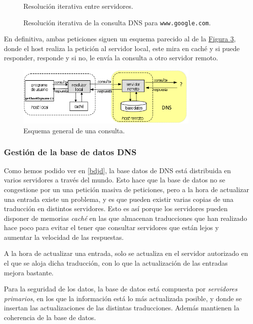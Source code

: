 \documentclass[10pt,a4paper,spanish]{report}
\begin{document}
\begin{enumerate}[\color{tema2}{$\square$}]
\begin{figure}[H]
    \caption{Resolución iterativa entre servidores.}
    \label{tema2_3}
  \end{figure}
  \begin{figure}[H]
    \centering
    
    \caption{Resolución iterativa de la consulta DNS para \texttt{www.google.com}.}
    \label{tema2_4}
    \end{figure}
 \end{enumerate} 

 En definitiva, ambas peticiones siguen un esquema parecido al de la \hyperref[tema2_5]{Figura \ref*{tema2_5}}, donde el host realiza la petición al servidor local, este mira en caché y si puede responder, responde y si no, le envía la consulta a otro servidor remoto.

\begin{figure}[H]
  \centering
  \includegraphics[width=0.8\textwidth]{tema2_4}
  \caption{Esquema general de una consulta.}
  \label{tema2_5}
\end{figure}

\subsubsection{\textcolor{tema2}Gestión de la base de datos DNS}

Como hemos podido ver en \ref{bdjd}, la base datos de DNS está distribuida en varios servidores a través del mundo. Esto hace que la base de datos no se congestione por un una petición masiva de peticiones, pero a la hora de actualizar una entrada existe un problema, y es que pueden existir varias copias de una traducción en distintos servidores. Esto es así porque los servidores pueden disponer de memorias \textit{\textcolor{tema2}{caché}} en las que almacenan traducciones que han realizado hace poco para evitar el tener que consultar servidores que están lejos y aumentar la velocidad de las respuestas.

A la hora de actualizar una entrada, solo se actualiza en el servidor autorizado en el que se aloja dicha traducción, con lo que la actualización de las entradas mejora bastante.

Para la seguridad de los datos, la base de datos está compuesta por \textit{\textcolor{tema2}{servidores primarios}}, en los que la información está lo más actualizada posible, y donde se insertan las actualizaciones de las distintas traducciones. Además mantienen la coherencia de la base de datos. 
\end{document}
